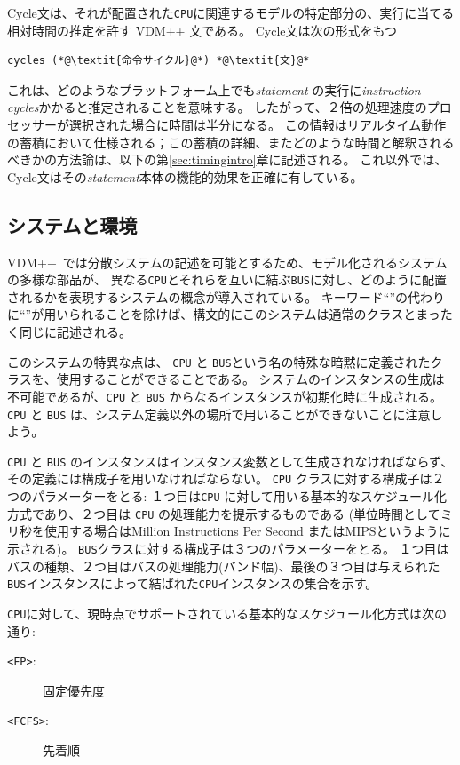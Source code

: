 \documentclass[\pformat,12pt]{jreport}
\newcommand{\vdmpp}{VDM++} %
\begin{document}
Cycle文は、それが配置された\texttt{CPU}に関連するモデルの特定部分の、実行に当てる相対時間の推定を許す VDM++ 文である。
Cycle文は次の形式をもつ

\begin{lstlisting}
cycles (*@\textit{命令サイクル}@*) *@\textit{文}@*
\end{lstlisting}

これは、どのようなプラットフォーム上でも\emph{statement} の実行に\emph{instruction cycles}かかると推定されることを意味する。
したがって、２倍の処理速度のプロセッサーが選択された場合に時間は半分になる。
この情報はリアルタイム動作の蓄積において仕様される；この蓄積の詳細、またどのような時間と解釈されるべきかの方法論は、以下の第\ref{sec:timingintro}章に記述される。
これ以外では、Cycle文はその\textit{statement}本体の機能的効果を正確に有している。

\subsection{システムと環境}

\vdmpp\ では分散システムの記述を可能とするため、モデル化されるシステムの多様な部品が、 
異なる\texttt{CPU}とそれらを互いに結ぶ\texttt{BUS}に対し、どのように配置されるかを表現するシステムの概念が導入されている。
キーワード``''の代わりに``''が用いられることを除けば、構文的にこのシステムは通常のクラスとまったく同じに記述される。

このシステムの特異な点は、 \texttt{CPU} と \texttt{BUS}という名の特殊な暗黙に定義されたクラスを、使用することができることである。
システムのインスタンスの生成は不可能であるが、\texttt{CPU} と \texttt{BUS} からなるインスタンスが初期化時に生成される。
 \texttt{CPU} と \texttt{BUS} は、システム定義以外の場所で用いることができないことに注意しよう。

\texttt{CPU} と \texttt{BUS} のインスタンスはインスタンス変数として生成されなければならず、その定義には構成子を用いなければならない。
\texttt{CPU} クラスに対する構成子は２つのパラメーターをとる: １つ目は\texttt{CPU} に対して用いる基本的なスケジュール化方式であり、２つ目は \texttt{CPU} の処理能力を提示するものである (単位時間としてミリ秒を使用する場合はMillion Instructions Per Second またはMIPSというように示される)。 
\texttt{BUS}クラスに対する構成子は３つのパラメーターをとる。
１つ目はバスの種類、２つ目はバスの処理能力(バンド幅)、最後の３つ目は与えられた \texttt{BUS}インスタンスによって結ばれた\texttt{CPU}インスタンスの集合を示す。

\texttt{CPU}に対して、現時点でサポートされている基本的なスケジュール化方式は次の通り:
\begin{description}
\item[\texttt{<FP>}:] 固定優先度
\item[\texttt{<FCFS>}:] 先着順
\end{description} 
\end{document}

